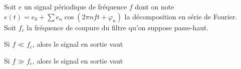 \documentclass[a4paper]{article}
\begin{document}
\pagestyle{fancy}
\fancyhf{}
\setlength{\headheight}{15pt}

\begin{center}
	\large{}
\end{center}


Soit \(e\) un signal périodique de fréquence \(f\) dont on note \(e(t)=e_0+\sum e_n\cos(2\pi nft +\varphi_n)\) la décomposition en série de Fourier.\\
Soit \(f_c\) la fréquence de coupure du filtre qu'on suppose passe-haut.

Si \(f\ll f_c\), alors le signal en sortie vaut \begin{center}\end{center}
Si \(f\gg f_c\), alors le signal en sortie vaut \begin{center}\end{center}
\end{document}
